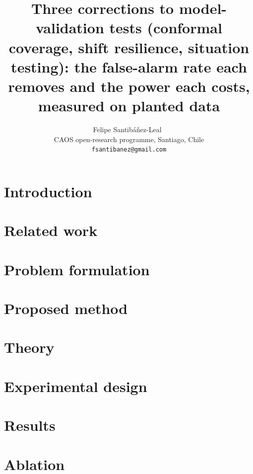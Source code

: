 \documentclass[11pt]{article}
\title{Three corrections to model-validation tests (conformal coverage, shift resilience, situation testing): the false-alarm rate each removes and the power each costs, measured on planted data}
\author{Felipe Santib\'a\~nez-Leal~\orcidlink{0000-0002-0150-3246}\\
\small CAOS open-research programme, Santiago, Chile\\
\small \texttt{fsantibanez@gmail.com}}
\date{\docdate}
\begin{document}
\maketitle
\headerblock

\begin{abstract}

\end{abstract}

\section{Introduction}
\label{sec:introduction}


\section{Related work}
\label{sec:related-work}


\section{Problem formulation}
\label{sec:problem}


\section{Proposed method}
\label{sec:proposed-method}


\section{Theory}
\label{sec:theory}


\section{Experimental design}
\label{sec:experimental-design}


\section{Results}
\label{sec:results}


\section{Ablation}
\label{sec:ablation}

\end{document}
